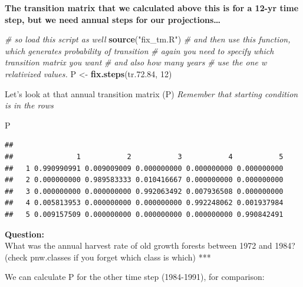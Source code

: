 \documentclass[
]{article}
\newenvironment{Shaded}{\begin{snugshade}}{\end{snugshade}}
\newcommand{\CommentTok}[1]{\textcolor[rgb]{0.56,0.35,0.01}{\textit{#1}}}
\newcommand{\DecValTok}[1]{\textcolor[rgb]{0.00,0.00,0.81}{#1}}
\newcommand{\FloatTok}[1]{\textcolor[rgb]{0.00,0.00,0.81}{#1}}
\newcommand{\FunctionTok}[1]{\textcolor[rgb]{0.13,0.29,0.53}{\textbf{#1}}}
\newcommand{\NormalTok}[1]{#1}
\newcommand{\OtherTok}[1]{\textcolor[rgb]{0.56,0.35,0.01}{#1}}
\newcommand{\SpecialCharTok}[1]{\textcolor[rgb]{0.81,0.36,0.00}{\textbf{#1}}}
\newcommand{\StringTok}[1]{\textcolor[rgb]{0.31,0.60,0.02}{#1}}
\begin{document}
\textbf{The transition matrix that we calculated above this is for a
12-yr time step, but we need annual steps for our projections\ldots{}}

\begin{Shaded}
\begin{Highlighting}[]
  \CommentTok{\# so load this script as well}
\FunctionTok{source}\NormalTok{(}\StringTok{"fix\_tm.R"}\NormalTok{)}
  \CommentTok{\# and then use this function, which generates probability of transition}
  \CommentTok{\# again you need to specify which transition matrix you want}
  \CommentTok{\# and also how many years}
  \CommentTok{\# use the one w relativized values.}
\NormalTok{P }\OtherTok{\textless{}{-}} \FunctionTok{fix.steps}\NormalTok{(tr.}\FloatTok{72.84}\NormalTok{, }\DecValTok{12}\NormalTok{)  }
\end{Highlighting}
\end{Shaded}

Let's look at that annual transition matrix (P) \emph{Remember that
starting condition is in the rows}

\begin{Shaded}
\begin{Highlighting}[]
\NormalTok{P  }
\end{Highlighting}
\end{Shaded}

\begin{verbatim}
##    
##               1           2           3           4           5
##   1 0.990990991 0.009009009 0.000000000 0.000000000 0.000000000
##   2 0.000000000 0.989583333 0.010416667 0.000000000 0.000000000
##   3 0.000000000 0.000000000 0.992063492 0.007936508 0.000000000
##   4 0.005813953 0.000000000 0.000000000 0.992248062 0.001937984
##   5 0.009157509 0.000000000 0.000000000 0.000000000 0.990842491
\end{verbatim}

\textbf{Question:}\\
What was the annual harvest rate of old growth forests between 1972 and
1984? (check pnw.classes if you forget which class is which) ***

We can calculate P for the other time step (1984-1991), for comparison:

\begin{Shaded}
\end{Shaded}
\end{document}

